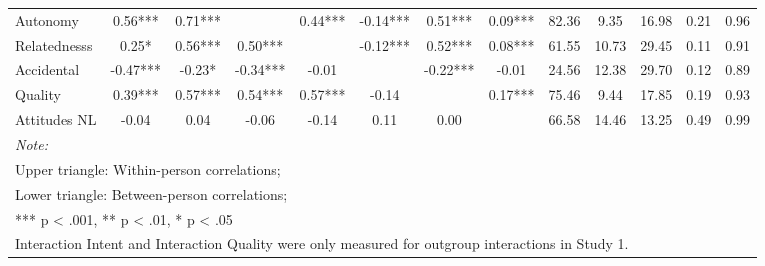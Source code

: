 \begin{table}
\begin{minipage}[t][\textheight][t]{\textwidth}
{\begin{tabular}[t]{lcccccccccccc}
\hspace{1em}Autonomy & 0.56*** & 0.71*** &  & 0.44*** & -0.14*** & 0.51*** & 0.09*** & 82.36 & 9.35 & 16.98 & 0.21 & 0.96\\
\hspace{1em}Relatednesss & 0.25* & 0.56*** & 0.50*** &  & -0.12*** & 0.52*** & 0.08*** & 61.55 & 10.73 & 29.45 & 0.11 & 0.91\\
\hspace{1em}Accidental & -0.47*** & -0.23* & -0.34*** & -0.01 &  & -0.22*** & -0.01 & 24.56 & 12.38 & 29.70 & 0.12 & 0.89\\
\hspace{1em}Quality & 0.39*** & 0.57*** & 0.54*** & 0.57*** & -0.14 &  & 0.17*** & 75.46 & 9.44 & 17.85 & 0.19 & 0.93\\
\hspace{1em}Attitudes NL & -0.04 & 0.04 & -0.06 & -0.14 & 0.11 & 0.00 &  & 66.58 & 14.46 & 13.25 & 0.49 & 0.99\\
\bottomrule
\multicolumn{13}{l}{\rule{0pt}{1em}\textit{Note: }}\\
\multicolumn{13}{l}{\rule{0pt}{1em}Upper triangle: Within-person correlations;}\\
\multicolumn{13}{l}{\rule{0pt}{1em}Lower triangle: Between-person correlations;}\\
\multicolumn{13}{l}{\rule{0pt}{1em}*** p < .001, ** p < .01,  * p < .05}\\
\multicolumn{13}{l}{\rule{0pt}{1em}Interaction Intent and Interaction Quality were only measured for outgroup interactions in Study 1.}\\
\end{tabular}}
\end{minipage}
\end{table}
